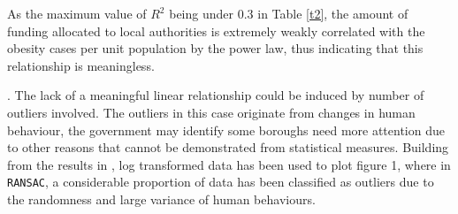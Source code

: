 \documentclass[12pt]{article}
\begin{document}
\begin{table}[H]
\begin{center}
\captionsetup{font=scriptsize}
\caption{coefficients related to the relationship between original and log-transformed total budget spent and obesity density} \label{t2}
\end{center}
\end{table}

As the maximum value of $R^2$ being under $0.3$ in Table \eqref{t2}, the amount of funding allocated to local authorities is extremely weakly correlated with the obesity cases per unit population by the power law, thus indicating that this relationship is meaningless. 


.
The lack of a meaningful linear relationship could be induced by number of outliers involved. The outliers in this case originate from changes in human behaviour, the government may identify some boroughs need more attention due to other reasons that cannot be demonstrated from statistical measures. Building from the results in , log transformed data has been used to plot figure 1, where in \verb|RANSAC|, a considerable proportion of data has been classified as outliers due to the randomness and large variance of human behaviours. 

\end{document}
